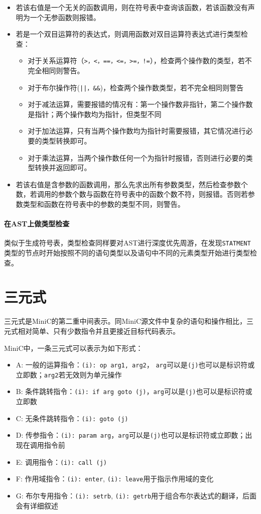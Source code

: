 \begin{itemize}
\begin{itemize}
	\item 若该右值是一个无关的函数调用，则在符号表中查询该函数，若该函数没有声明为一个无参函数则报错。
	\item 若是一个双目运算符的表达式，则调用函数对双目运算符表达式进行类型检查：
	\begin{itemize}
		\item 对于关系运算符（\verb|>，<，==，<=，>=，!=|），检查两个操作数的类型，若不完全相同则警告。
		\item 对于布尔操作符(\verb+||，&&+)，检查两个操作数类型，若不完全相同则警告
		\item 对于减法运算，需要报错的情况有：第一个操作数非指针，第二个操作数是指针；两个操作数均为指针，但类型不同
		\item 对于加法运算，只有当两个操作数均为指针时需要报错，其它情况进行必要的类型转换即可。
		\item 对于乘法运算，当两个操作数任何一个为指针时报错，否则进行必要的类型转换并返回即可。
	\end{itemize}
	\item 若该右值是含参数的函数调用，那么先求出所有参数类型，然后检查参数个数，若调用的参数个数与函数在符号表中的函数个数不符，则报错。否则若参数类型和函数在符号表中的参数的类型不同，则警告。
\end{itemize}
\end{itemize}
\paragraph*{在AST上做类型检查}
类似于生成符号表，类型检查同样要对AST进行深度优先周游，在发现\verb|STATMENT|类型的节点时开始按照不同的语句类型以及语句中不同的元素类型开始进行类型检查。


\section{三元式}
\label{triple}
三元式是MiniC的第二重中间表示。同MiniC源文件中复杂的语句和操作相比，三元式相对简单、只有少数指令并且更接近目标代码表示。

MiniC中，一条三元式可以表示为如下形式：
\begin{itemize}
\item A: 一般的运算指令：\verb|(i): op arg1, arg2|， \verb|arg|可以是\verb|(j)|也可以是标识符或立即数；\verb|arg2|若无效则为单元操作
\item B: 条件跳转指令：\verb|(i): if arg goto (j)|，\verb|arg|可以是\verb|(j)|也可以是标识符或立即数
\item C: 无条件跳转指令：\verb|(i): goto (j)|
\item D: 传参指令：\verb|(i): param arg|，\verb|arg|可以是\verb|(j)|也可以是标识符或立即数；出现在调用指令前
\item E: 调用指令：\verb|(i): call (j)|
\item F: 作用域指令：\verb|(i): enter|, \verb|(i): leave|用于指示作用域的变化
\item G: 布尔专用指令：\verb|(i): setrb|, \verb|(i): getrb|用于组合布尔表达式的翻译，后面会有详细叙述
\end{itemize}
